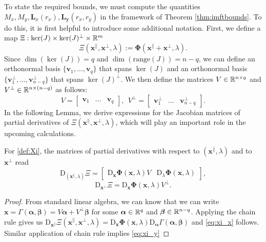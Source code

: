 \documentclass[letterpaper, 10 pt, conference, dvipsnames]{ieeeconf}
\begin{document}
To state the required bounds, we must compute the quantities \(M_x, M_y, \mathbf{L}_x(r_x), \mathbf{L}_{\mathbf{y}}(r_x,r_y)\) in the framework of Theorem \ref{thm:imftbounds}. To do this, it is first helpful to introduce some additional notation. First, we define a  map \(\Xi:\ker(J) \times \ker(J)^{\perp} \times \R[m] \) \begin{equation}
    \Xi(\mathbf{x}^\parallel,\mathbf{x}^\perp,\lambda) := \boldsymbol{\Phi}(\mathbf{x}^\parallel+\mathbf{x}^\perp,\lambda).\label{def:Xi}
\end{equation}
Since \(\dim(\ker(J)) = q\) and \(\dim(\mathrm{range}(J)) = n-q\), we can define an orthonormal basis \(\{\mathbf{v}_1, \dots, \mathbf{v}_q\}\) that spans \(\ker(J)\) and an orthonormal basis \(\{\mathbf{v}_1^{\perp}, \dots, \mathbf{v}_{n-q}^{\perp}\}\) that spans \(\ker(J)^{\perp}\). We then define the matrices \(V\in\R[n \times q]\) and \(V^{\perp}\in\R[n\times(n-q)]\) as follows:
\begin{equation}
    V = \begin{bmatrix} \mathbf{v}_1 & \dots & \mathbf{v}_q \end{bmatrix}, \ \
    V^{\perp} = \begin{bmatrix} \mathbf{v}_1^{\perp} & \dots & \mathbf{v}_{n-q}^{\perp} \end{bmatrix}. \label{def:V}
\end{equation}
In the following Lemma, we derive expressions for the Jacobian matrices of partial derivatives of \(\Xi(\mathbf{x}^{\parallel}, \mathbf{x}^{\perp}, \lambda)\), which will play an important role in the upcoming calculations.

\lem \label{lem:Jacobians}
For \eqref{def:Xi}, the matrices of partial derivatives with respect to \((\mathbf{x}^{\parallel},\lambda)\) and to \(\mathbf{x}^{\perp}\) read
\begin{equation}
    \mathrm{D}_{(\mathbf{x}^{\parallel}, \lambda)}\Xi = \begin{bmatrix}\mathrm{D}_{\mathbf{x}}\boldsymbol{\Phi}(\mathbf{x},\lambda)V&\mathrm{D}_{\lambda}\boldsymbol{\Phi}(\mathbf{x},\lambda)\end{bmatrix}, \label{eq:xi_x}
\end{equation}
\begin{equation}
    \mathrm{D}_{\mathbf{x}^{\perp}}\Xi = \mathrm{D}_{\mathbf{x}} \boldsymbol{\Phi}(\mathbf{x},\lambda) V^{\perp}. \label{eq:xi_y}
\end{equation}
\begin{proof}
    From standard linear algebra, we can know that we can write {\(\mathbf{x} = \Gamma(\boldsymbol{\alpha},\boldsymbol{\beta}) = V\boldsymbol{\alpha} + V^{\perp}\boldsymbol{\beta}\) for some \(\boldsymbol{\alpha}\in\R[q]\) and \(\boldsymbol{\beta}\in\R[n-q]\).} Applying the chain rule gives us \(\mathrm{D}_{\mathbf{x}^{\parallel}} \Xi(\mathbf{x}^{\parallel}, \mathbf{x}^{\perp},\lambda) = \mathrm{D}_{\mathbf{x}} \mathbf{\Phi}(\mathbf{x},\lambda) \mathrm{D}_{\boldsymbol{\alpha}}\Gamma(\boldsymbol{\alpha},\boldsymbol{\beta})\) and \eqref{eq:xi_x} follows. Similar application of chain rule implies \eqref{eq:xi_y}
\end{proof}
\end{document}
